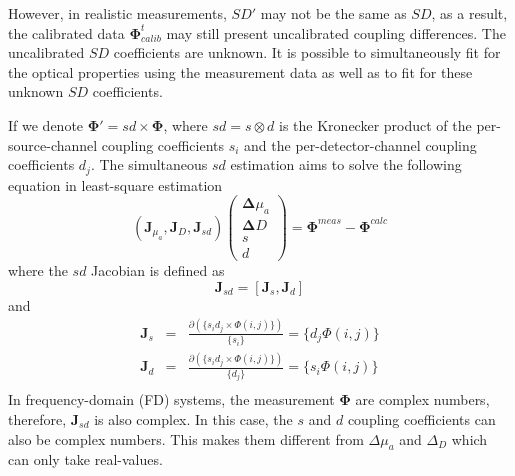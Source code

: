 \documentclass[12pt]{book}               %
\begin{document}
However, in realistic measurements, $SD'$ may not be the same as $SD$, as a result, the calibrated data $\mathbf{\Phi}^{t}_{calib}$ may still present uncalibrated coupling differences. The uncalibrated $SD$ coefficients are unknown. It is possible to simultaneously fit for the optical properties using the measurement data as well as to fit for these unknown $SD$ coefficients.

If we denote $\mathbf{\Phi}'=sd\times\mathbf{\Phi}$, where $sd=s\otimes d$ is the Kronecker product of the per-source-channel coupling coefficients $s_i$ and the per-detector-channel coupling coefficients $d_j$. The simultaneous $sd$ estimation aims to solve the following equation in least-square estimation
\begin{equation}
\left(\mathbf{J}_{\mu_a},\mathbf{J}_{D},\mathbf{J}_{sd}\right)\left(
\begin{array}{c}
\boldsymbol{\Delta}{\mu_a}\\
\boldsymbol{\Delta}{D} \\
s\\d
\end{array}
\right)=\boldsymbol{\Phi}^{meas}-\boldsymbol{\Phi}^{calc}
\end{equation}
where the $sd$ Jacobian is defined as
\begin{equation}\label{eq:Jsd}
\mathbf{J}_{sd}=\left[\mathbf{J}_{s}, \mathbf{J}_{d}\right]
\end{equation}
and
\begin{eqnarray}\label{eq:JsJd}
\mathbf{J}_{s} &=& \frac{\partial(\{s_id_j\times\Phi(i,j)\})}{\{s_i\}}=\{d_j\Phi(i,j)\}\\
\mathbf{J}_{d} &=& \frac{\partial(\{s_id_j\times\Phi(i,j)\})}{\{d_j\}}=\{s_i\Phi(i,j)\}\\
\end{eqnarray}
In frequency-domain (FD) systems, the measurement $\mathbf\Phi$ are complex numbers, therefore, $\mathbf{J}_{sd}$ is also complex. In this case, the $s$ and $d$ coupling coefficients can also be complex numbers. This makes them different from $\Delta\mu_a$ and $\Delta_D$ which can only take real-values.
\end{document}
